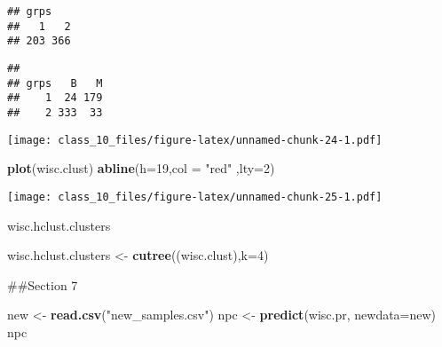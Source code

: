 \documentclass[
]{article}
\newenvironment{Shaded}{\begin{snugshade}}{\end{snugshade}}
\newcommand{\DataTypeTok}[1]{\textcolor[rgb]{0.13,0.29,0.53}{#1}}
\newcommand{\DecValTok}[1]{\textcolor[rgb]{0.00,0.00,0.81}{#1}}
\newcommand{\KeywordTok}[1]{\textcolor[rgb]{0.13,0.29,0.53}{\textbf{#1}}}
\newcommand{\NormalTok}[1]{#1}
\newcommand{\OperatorTok}[1]{\textcolor[rgb]{0.81,0.36,0.00}{\textbf{#1}}}
\newcommand{\StringTok}[1]{\textcolor[rgb]{0.31,0.60,0.02}{#1}}
\begin{document}
\begin{verbatim}
## grps
##   1   2 
## 203 366
\end{verbatim}

\begin{Shaded}
\end{Shaded}

\begin{verbatim}
##     
## grps   B   M
##    1  24 179
##    2 333  33
\end{verbatim}

\begin{Shaded}
\end{Shaded}

\texttt{[image: class\_10\_files/figure-latex/unnamed-chunk-24-1.pdf]}

\begin{Shaded}
\begin{Highlighting}[]
\KeywordTok{plot}\NormalTok{(wisc.clust)}
\KeywordTok{abline}\NormalTok{(}\DataTypeTok{h=}\DecValTok{19}\NormalTok{,}\DataTypeTok{col =} \StringTok{"red"}\NormalTok{ ,}\DataTypeTok{lty=}\DecValTok{2}\NormalTok{)}
\end{Highlighting}
\end{Shaded}

\texttt{[image: class\_10\_files/figure-latex/unnamed-chunk-25-1.pdf]}

wisc.hclust.clusters

\begin{Shaded}
\begin{Highlighting}[]
\NormalTok{wisc.hclust.clusters <-}\StringTok{ }\KeywordTok{cutree}\NormalTok{((wisc.clust),}\DataTypeTok{k=}\DecValTok{4}\NormalTok{)}
\end{Highlighting}
\end{Shaded}

\#\#Section 7

\begin{Shaded}
\begin{Highlighting}[]
\NormalTok{new <-}\StringTok{ }\KeywordTok{read.csv}\NormalTok{(}\StringTok{"new_samples.csv"}\NormalTok{)}
\NormalTok{npc <-}\StringTok{ }\KeywordTok{predict}\NormalTok{(wisc.pr, }\DataTypeTok{newdata=}\NormalTok{new)}
\NormalTok{npc}
\end{Highlighting}
\end{Shaded}
\end{document}
